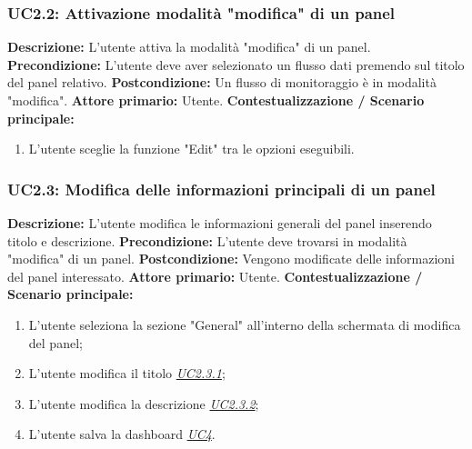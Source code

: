                 \subsubsection{UC2.2: Attivazione modalità "modifica" di un panel}
                    \textbf{Descrizione:} L'utente attiva la modalità "modifica" di un panel.
                    \newline
                    \textbf{Precondizione:} L'utente deve aver selezionato un flusso dati premendo sul titolo del panel relativo.
                    \newline
                    \textbf{Postcondizione:} Un flusso di monitoraggio è in modalità "modifica".
                    \newline
                    \textbf{Attore primario:} Utente.
                    \newline
                    \textbf{Contestualizzazione / Scenario principale:} \begin{enumerate}
                        \item L’utente sceglie la funzione "Edit" tra le opzioni eseguibili.
                    \end{enumerate}
                    
                    
                    
                \subsubsection{UC2.3:  Modifica delle informazioni principali di un panel}
                    \textbf{Descrizione:} L’utente modifica le informazioni generali del panel inserendo titolo e descrizione.
                    \newline
                    \textbf{Precondizione:} L'utente deve trovarsi in modalità "modifica" di un panel.
                    \newline
                    \textbf{Postcondizione:} Vengono modificate delle informazioni del panel interessato.
                    \newline
                    \textbf{Attore primario:} Utente.
                    \newline
                    \textbf{Contestualizzazione / Scenario principale:} \begin{enumerate}
                        \item L'utente seleziona la sezione "General" all'interno della schermata di modifica del panel;
                        \item L’utente modifica il titolo \underline{\textit{UC2.3.1}};
                        \item L’utente modifica la descrizione \underline{\textit{UC2.3.2}};
                        \item L'utente salva la dashboard \underline{\textit{UC4}}.
                    \end{enumerate}
                    
